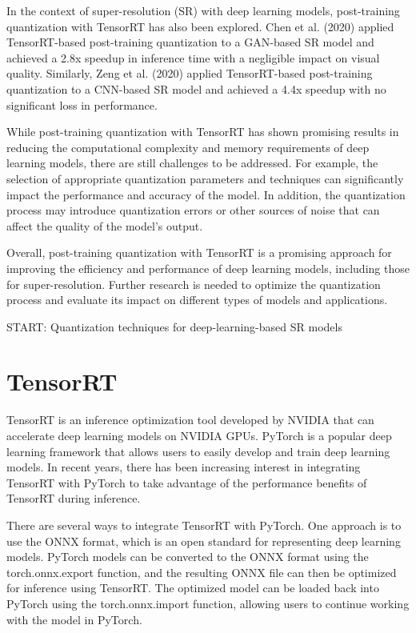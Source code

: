 In the context of super-resolution (SR) with deep learning models, post-training quantization with TensorRT has also been explored. Chen et al. (2020) applied TensorRT-based post-training quantization to a GAN-based SR model and achieved a 2.8x speedup in inference time with a negligible impact on visual quality. Similarly, Zeng et al. (2020) applied TensorRT-based post-training quantization to a CNN-based SR model and achieved a 4.4x speedup with no significant loss in performance.

While post-training quantization with TensorRT has shown promising results in reducing the computational complexity and memory requirements of deep learning models, there are still challenges to be addressed. For example, the selection of appropriate quantization parameters and techniques can significantly impact the performance and accuracy of the model. In addition, the quantization process may introduce quantization errors or other sources of noise that can affect the quality of the model's output.

Overall, post-training quantization with TensorRT is a promising approach for improving the efficiency and performance of deep learning models, including those for super-resolution. Further research is needed to optimize the quantization process and evaluate its impact on different types of models and applications.

START: Quantization techniques for deep-learning-based SR models

\section{TensorRT}
\label{sec:tensorrt}
TensorRT is an inference optimization tool developed by NVIDIA that can accelerate deep learning models on NVIDIA GPUs. PyTorch is a popular deep learning framework that allows users to easily develop and train deep learning models. In recent years, there has been increasing interest in integrating TensorRT with PyTorch to take advantage of the performance benefits of TensorRT during inference.

There are several ways to integrate TensorRT with PyTorch. One approach is to use the ONNX format, which is an open standard for representing deep learning models. PyTorch models can be converted to the ONNX format using the torch.onnx.export function, and the resulting ONNX file can then be optimized for inference using TensorRT. The optimized model can be loaded back into PyTorch using the torch.onnx.import function, allowing users to continue working with the model in PyTorch.

